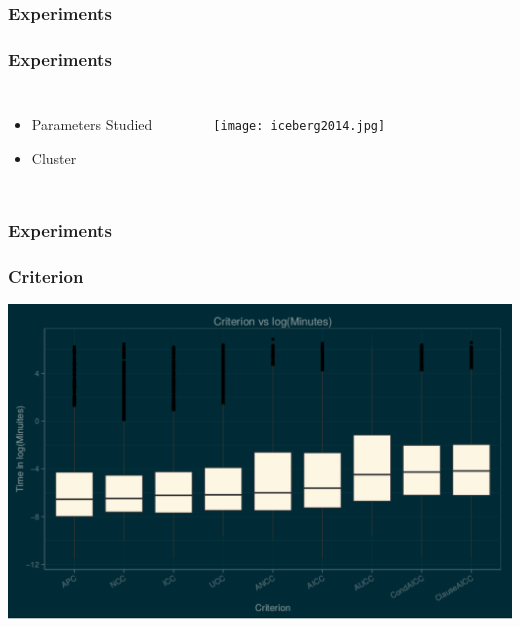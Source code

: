 \documentclass[hyperref]{beamer}
\begin{document}
      \begin{frame}
        \frametitle{Experiments}
        \centering
        
        
      \end{frame}

      \begin{frame}
        \frametitle{Experiments}
        \begin{columns}
        \begin{itemize}
          \item Parameters Studied
          \item Cluster
        \end{itemize}
          \begin{figure}
            \texttt{[image: iceberg2014.jpg]}
          \end{figure}
      \end{columns}
      \end{frame}

         \begin{frame}
        \frametitle{Experiments}
        \centering
        
        
      \end{frame}

      \begin{frame}
        \frametitle{Criterion}
        \includegraphics[width=\textwidth]{CriterionBox}
        

      \end{frame}
\end{document}
